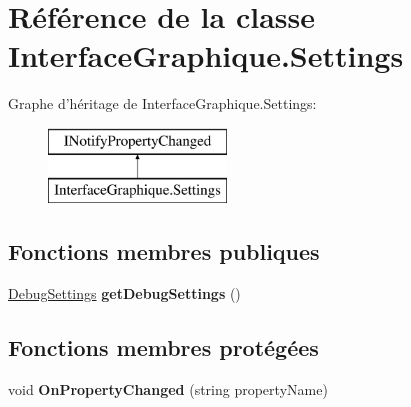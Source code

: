 \hypertarget{class_interface_graphique_1_1_settings}{\section{Référence de la classe Interface\-Graphique.\-Settings}
\label{class_interface_graphique_1_1_settings}
}
Graphe d'héritage de Interface\-Graphique.\-Settings\-:\begin{figure}[H]
\begin{center}
\leavevmode
\includegraphics[height=2.000000cm]{class_interface_graphique_1_1_settings}
\end{center}
\end{figure}
\subsection*{Fonctions membres publiques}
\begin{DoxyCompactItemize}
\item 
\hypertarget{class_interface_graphique_1_1_settings_a0b1406ba0e8592e9a4736f33c374af0c}{\hyperlink{struct_interface_graphique_1_1_debug_settings}{Debug\-Settings} {\bfseries get\-Debug\-Settings} ()}\label{class_interface_graphique_1_1_settings_a0b1406ba0e8592e9a4736f33c374af0c}

\end{DoxyCompactItemize}
\subsection*{Fonctions membres protégées}
\begin{DoxyCompactItemize}
\item 
\hypertarget{class_interface_graphique_1_1_settings_af5b8a962e22ebd44085db80a2ecacd37}{void {\bfseries On\-Property\-Changed} (string property\-Name)}\label{class_interface_graphique_1_1_settings_af5b8a962e22ebd44085db80a2ecacd37}

\end{DoxyCompactItemize}
